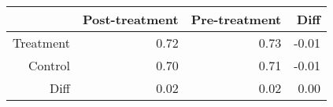\begin{table}[ht]
\centering
\begin{tabular}{rrrr}
  \hline
 & Post-treatment & Pre-treatment & Diff \\ 
  \hline
Treatment & 0.72 & 0.73 & -0.01 \\ 
  Control & 0.70 & 0.71 & -0.01 \\ 
  Diff & 0.02 & 0.02 & 0.00 \\ 
   \hline
\end{tabular}
\end{table}
